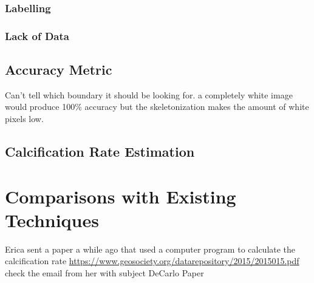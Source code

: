 \subsubsection{Labelling}

\subsubsection{Lack of Data}

\subsection{Accuracy Metric}

Can't tell which boundary it should be looking for. a completely white image would produce 100\% accuracy but the skeletonization makes the amount of white pixels low.

\subsection{Calcification Rate Estimation}

\section{Comparisons with Existing Techniques}

Erica sent a paper a while ago that used a computer program to calculate the calcification rate  \url{https://www.geosociety.org/datarepository/2015/2015015.pdf} check the email from her with subject DeCarlo Paper




